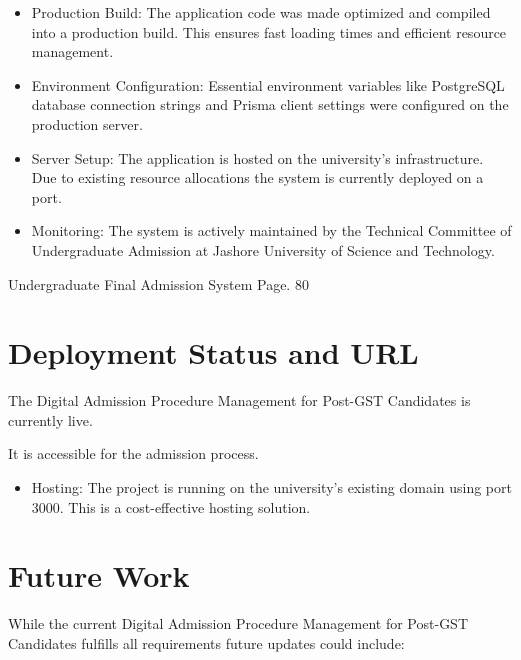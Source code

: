 \begin{itemize}
    \item {Production Build:} The application code was made optimized and compiled into a production build. This ensures fast loading times and efficient resource management.

    \item {Environment Configuration:} Essential environment variables like PostgreSQL database connection strings and Prisma client settings were configured on the production server.

    \item {Server Setup:} The application is hosted on the university’s infrastructure. Due to existing resource allocations the system is currently deployed on a port.

    \item {Monitoring:} The system is actively maintained by the Technical Committee of Undergraduate Admission at Jashore University of Science and Technology.
\end{itemize}

\noindent Undergraduate Final Admission System Page. 80

\section{Deployment Status and URL}

\noindent The Digital Admission Procedure Management for Post-GST Candidates is currently live.

\vspace{0.3cm}

\noindent It is accessible for the admission process.

\begin{itemize}
    \item {Hosting:} The project is running on the university’s existing domain using port 3000. This is a cost-effective hosting solution.
\end{itemize}

\section{Future Work}

\noindent While the current Digital Admission Procedure Management for Post-GST Candidates fulfills all requirements future updates could include:

